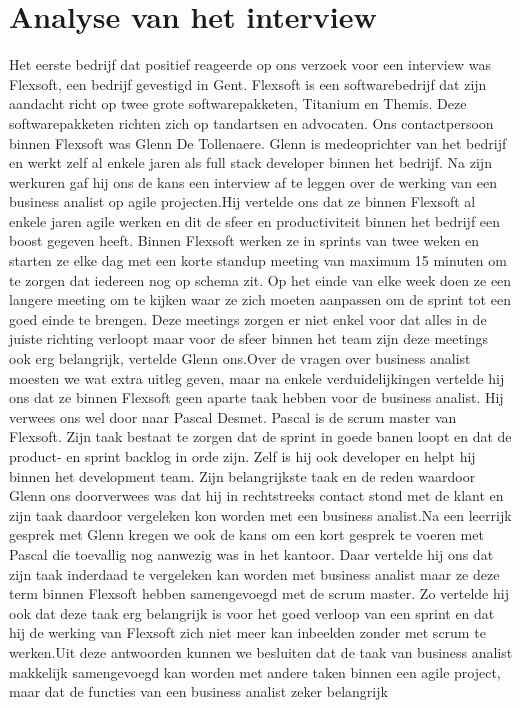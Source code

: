 \documentclass{hogent-article}
\begin{document}
	\section{Analyse van het interview}
	Het eerste bedrijf dat positief reageerde op ons verzoek voor een interview was Flexsoft, een bedrijf gevestigd in Gent. Flexsoft is een softwarebedrijf dat zijn aandacht richt op twee grote softwarepakketen, Titanium en Themis. Deze softwarepakketen richten zich op tandartsen en advocaten. \newline \newline Ons contactpersoon binnen Flexsoft was Glenn De Tollenaere. Glenn is medeoprichter van het bedrijf en werkt zelf al enkele jaren als full stack developer binnen het bedrijf. Na zijn werkuren gaf hij ons de kans een interview af te leggen over de werking van een business analist op agile projecten.\newline \newline Hij vertelde ons dat ze binnen Flexsoft al enkele jaren agile werken en dit de sfeer en productiviteit binnen het bedrijf een boost gegeven heeft. Binnen Flexsoft werken ze in sprints van twee weken en starten ze elke dag met een korte standup meeting van maximum 15 minuten om te zorgen dat iedereen nog op schema zit. Op het einde van elke week doen ze een langere meeting om te kijken waar ze zich moeten aanpassen om de sprint tot een goed einde te brengen. Deze meetings zorgen er niet enkel voor dat alles in de juiste richting verloopt maar voor de sfeer binnen het team zijn deze meetings ook erg belangrijk, vertelde Glenn ons.\newline \newline Over de vragen over business analist moesten we wat extra uitleg geven, maar na enkele verduidelijkingen vertelde hij ons dat ze binnen Flexsoft geen aparte taak hebben voor de business analist. Hij verwees ons wel door naar Pascal Desmet. Pascal is de scrum master van Flexsoft. Zijn taak bestaat te zorgen dat de sprint in goede banen loopt en dat de product- en sprint backlog in orde zijn. Zelf is hij ook developer en helpt hij binnen het development team. Zijn belangrijkste taak en de reden waardoor Glenn ons doorverwees was dat hij in rechtstreeks contact stond met de klant en zijn taak daardoor vergeleken kon worden met een business analist.\newline \newline Na een leerrijk gesprek met Glenn kregen we ook de kans om een kort gesprek te voeren met Pascal die toevallig nog aanwezig was in het kantoor. Daar vertelde hij ons dat zijn taak inderdaad te vergeleken kan worden met business analist maar ze deze term binnen Flexsoft hebben samengevoegd met de scrum master. Zo vertelde hij ook dat deze taak erg belangrijk is voor het goed verloop van een sprint en dat hij de werking van Flexsoft zich niet meer kan inbeelden zonder met scrum te werken.\newline \newline Uit deze antwoorden kunnen we besluiten dat de taak van business analist makkelijk samengevoegd kan worden met andere taken binnen een agile project, maar dat de functies van een business analist zeker belangrijk 
\end{document}
